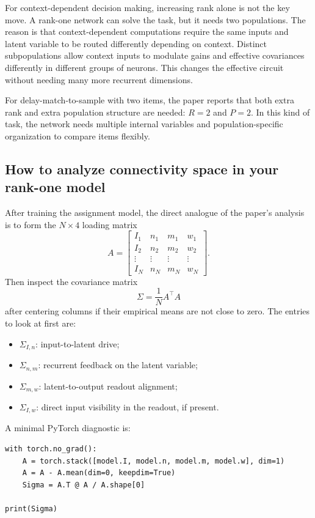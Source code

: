 \documentclass[11pt]{article}
\begin{document}
For context-dependent decision making, increasing rank alone is not the key
move. A rank-one network can solve the task, but it needs two populations. The
reason is that context-dependent computations require the same inputs and latent
variable to be routed differently depending on context. Distinct subpopulations
allow context inputs to modulate gains and effective covariances differently in
different groups of neurons. This changes the effective circuit without needing
many more recurrent dimensions.

For delay-match-to-sample with two items, the paper reports that both extra
rank and extra population structure are needed: $R=2$ and $P=2$. In this kind of
task, the network needs multiple internal variables and population-specific
organization to compare items flexibly.

\subsection{How to analyze connectivity space in your rank-one model}

After training the assignment model, the direct analogue of the paper's analysis
is to form the $N \times 4$ loading matrix
\[
  A =
  \left[
  \begin{array}{cccc}
  I_1 & n_1 & m_1 & w_1\\
  I_2 & n_2 & m_2 & w_2\\
  \vdots & \vdots & \vdots & \vdots\\
  I_N & n_N & m_N & w_N
  \end{array}
  \right].
\]
Then inspect the covariance matrix
\[
  \Sigma = \frac{1}{N}A^\top A
\]
after centering columns if their empirical means are not close to zero. The
entries to look at first are:
\begin{itemize}
  \item $\Sigma_{I,n}$: input-to-latent drive;
  \item $\Sigma_{n,m}$: recurrent feedback on the latent variable;
  \item $\Sigma_{m,w}$: latent-to-output readout alignment;
  \item $\Sigma_{I,w}$: direct input visibility in the readout, if present.
\end{itemize}

A minimal PyTorch diagnostic is:
\begin{lstlisting}[style=python]
with torch.no_grad():
    A = torch.stack([model.I, model.n, model.m, model.w], dim=1)
    A = A - A.mean(dim=0, keepdim=True)
    Sigma = A.T @ A / A.shape[0]

print(Sigma)
\end{lstlisting}
\end{document}
